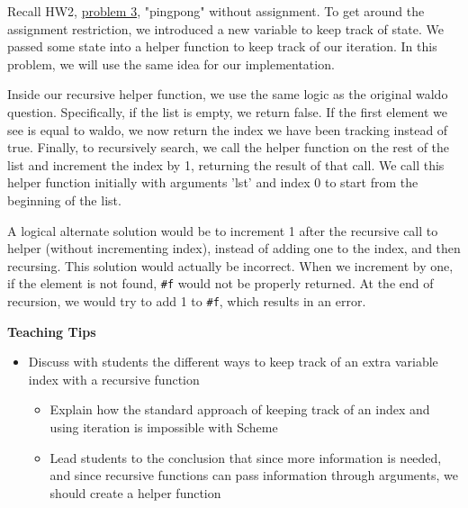 \begin{blocksection}
\begin{solution}
Recall HW2, \href{https://cs61a.org/hw/sol-hw02/#q3}{problem 3}, "pingpong" without assignment. To get around the assignment restriction, we introduced a new variable to keep track of state. We passed some state into a helper function to keep track of our iteration. In this problem, we will use the same idea for our implementation.

Inside our recursive helper function, we use the same logic as the original waldo question. Specifically, if the list is empty, we return false. If the first element we see is equal to waldo, we now return the index we have been tracking instead of true. Finally, to recursively search, we call the helper function on the rest of the list and increment the index by 1, returning the result of that call. We call this helper function initially with arguments 'lst' and index 0 to start from the beginning of the list.

A logical alternate solution would be to increment 1 after the recursive call to helper (without incrementing index), instead of adding one to the index, and then recursing. This solution would actually be incorrect. When we increment by one, if the element is not found, \texttt{\#f} would not be properly returned. At the end of recursion, we would try to add 1 to \texttt{\#f}, which results in an error.
\end{solution}

\end{blocksection}

\begin{blocksection}
\begin{guide}
\textbf{Teaching Tips}
\begin{itemize}
  \item Discuss with students the different ways to keep track of an extra variable index with a recursive function
  \begin{itemize}
    \item Explain how the standard approach of keeping track of an index and using iteration is impossible with Scheme
    \item Lead students to the conclusion that since more information is needed, and since recursive functions can pass information through arguments, we should create a helper function
  \end{itemize}
\end{itemize}
\end{guide}
\end{blocksection}
